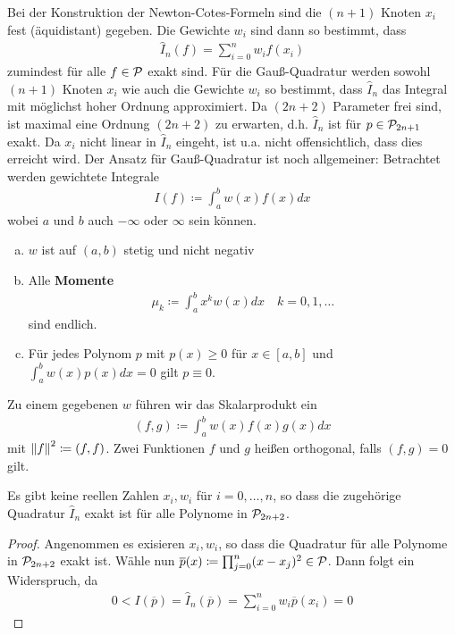 \documentclass[ngerman,fontsize=11pt, paper=a4, parskip=half, titlepage=true, toc=bib]{scrbook}
\begin{document}
Bei der Konstruktion der Newton-Cotes-Formeln sind die
$(n+1)$ Knoten $x_i$ fest (äquidistant) gegeben.
Die Gewichte $w_i$ sind dann so bestimmt, dass
\begin{gather*}
  \hat{I}_n(f) =\sum_{i=0}^n w_if(x_i)
\end{gather*}
zumindest für alle $f\in\mathcal{P}$ exakt sind.
Für die Gauß-Quadratur werden sowohl $(n+1)$ Knoten $x_i$
wie auch die Gewichte $w_i$ so bestimmt, dass
$\hat{I}_n$ das Integral
mit möglichst hoher Ordnung approximiert.
Da $(2n+2)$ Parameter frei sind,
ist maximal eine Ordnung $(2n+2)$ zu erwarten,
d.h. $\hat{I}_n$ ist für $p\in\mathcal{P}_{2n+1}$ exakt.
Da $x_i$ nicht linear in $\hat{I}_n$ eingeht,
ist u.a. nicht offensichtlich,
dass dies erreicht wird.
Der Ansatz für Gauß-Quadratur ist noch allgemeiner:
Betrachtet werden gewichtete Integrale
\begin{gather}
  I(f) \coloneqq \int_a^bw(x)f(x)dx
\label{VII.4.1}
\end{gather}
wobei $a$ und $b$ auch $-\infty$ oder $\infty$ sein können.

\begin{enumerate}[a)]
\item $w$ ist auf $(a,b)$ stetig und nicht negativ 
\item Alle \textbf{Momente}
  \begin{gather*}
    \mu_k\coloneqq \int_a^b x^kw(x)dx\quad k=0,1,\ldots
  \end{gather*}
  sind endlich.
\item Für jedes Polynom $p$ mit $p(x) \geq 0$
  für $x\in[a,b]$ und $\int_a^bw(x)p(x)dx=0$
  gilt $p\equiv 0$.
\end{enumerate}
Zu einem gegebenen $w$ führen wir das
Skalarprodukt ein
\begin{gather}
  (f,g)\coloneqq \int_a^bw(x)f(x)g(x)dx 
  \label{VII.4.2}
\end{gather}
mit $\left\| f \right\|^2\coloneqq (f,f)$.
Zwei Funktionen $f$ und $g$ heißen orthogonal,
falls $(f,g)=0$ gilt.

\begin{Leme}
  \label{7.4.2}
  Es gibt keine reellen Zahlen $x_i, w_i$ für $i=0,\ldots,n$,
so dass die zugehörige Quadratur $\hat{I}_n$ exakt ist
für alle Polynome in $\mathcal{P}_{2n+2}$.

\begin{proof}
  Angenommen es exisieren $x_i,w_i$, so dass die Quadratur
für alle Polynome in $\mathcal{P}_{2n+2}$ exakt ist.
Wähle nun $\overline{p}(x)\coloneqq
\prod_{j=0}^n(x-x_j)^2\in\mathcal{P}$.
Dann folgt ein Widerspruch, da
\begin{gather*}
  0<I(\overline{p})=\hat{I}_n(\overline{p})
  =\sum_{i=0}^nw_i\overline{p}(x_i) = 0
\end{gather*}
\end{proof}
\end{Leme}
\end{document}
